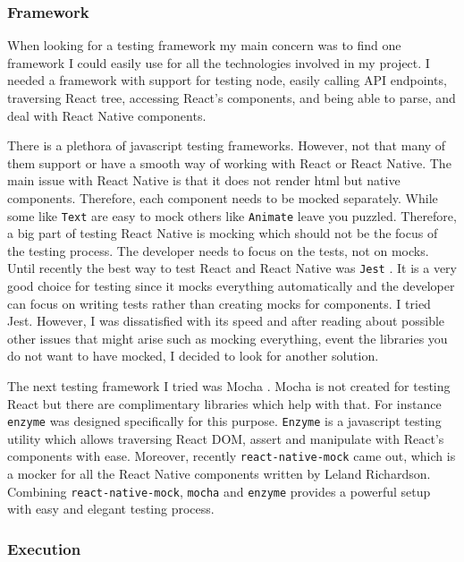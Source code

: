 \documentclass[thesis=M,english]{FITthesis}[2012/10/20]
\begin{document}
\subsubsection{Framework}

When looking for a testing framework my main concern was to find one framework I could easily use for all the technologies involved in my project. I needed a framework with support for testing node, easily calling API endpoints, traversing React tree, accessing React's components, and being able to parse, and deal with React Native components.

There is a plethora of javascript testing frameworks. However, not that many of them support or have a smooth way of working with React or React Native. The main issue with React Native is that it does not render html but native components. Therefore, each component needs to be mocked separately. While some like \verb|Text| are easy to mock others like \verb|Animate| leave you puzzled. Therefore, a big part of testing React Native is mocking which should not be the focus of the testing process. The developer needs to focus on the tests, not on mocks. Until recently the best way to test React and React Native was \verb|Jest| \cite{jest}. It is a very good choice for testing since it mocks everything automatically and the developer can focus on writing tests rather than creating mocks for components. I tried Jest. However, I was dissatisfied with its speed and after reading about possible other issues that might arise such as mocking everything, event the libraries you do not want to have mocked, I decided to look for another solution. \cite{redux-tests}

The next testing framework I tried was Mocha \cite{mocha}. Mocha is not created for testing React but there are complimentary libraries which help with that. For instance \verb|enzyme| \cite{enzyme} was designed specifically for this purpose. \verb|Enzyme| is a javascript testing utility which allows traversing React DOM, assert and manipulate with React's components with ease. Moreover, recently \verb|react-native-mock| \cite{react-native-mock} came out, which is a mocker for all the React Native components written by Leland Richardson. Combining \verb|react-native-mock|,  \verb|mocha| and \verb|enzyme| provides a powerful setup with easy and elegant testing process.

\subsubsection{Execution}
\end{document}
